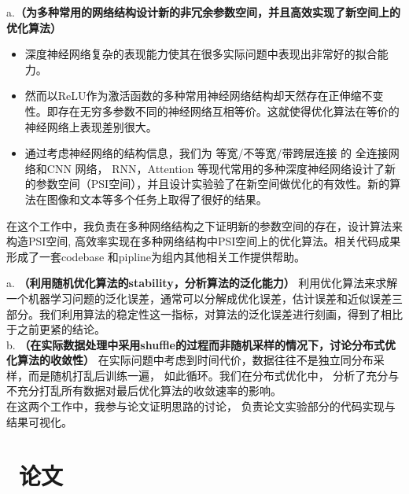 \documentclass{resume}
\begin{document}

a.\textbf{（为多种常用的网络结构设计新的非冗余参数空间，并且高效实现了新空间上的优化算法）} 

\begin{itemize}
  \item 深度神经网络复杂的表现能力使其在很多实际问题中表现出非常好的拟合能力。%
  \item 然而以ReLU作为激活函数的多种常用神经网络结构却天然存在正伸缩不变性。即存在无穷多参数不同的神经网络互相等价。这就使得优化算法在等价的神经网络上表现差别很大。
  \item 通过考虑神经网络的结构信息，我们为  等宽/不等宽/带跨层连接 的 全连接网络和CNN 网络， RNN，Attention 等现代常用的多种深度神经网络设计了新的参数空间（PSI空间），并且设计实验验了在新空间做优化的有效性。新的算法在图像和文本等多个任务上取得了很好的结果。
\end{itemize} 
    
 \faHandORight 在这个工作中，我负责在多种网络结构之下证明新的参数空间的存在，设计算法来构造PSI空间, 高效率实现在多种网络结构中PSI空间上的优化算法。相关代码成果形成了一套codebase 和pipline为组内其他相关工作提供帮助。

   

 a. \textbf{（利用随机优化算法的stability，分析算法的泛化能力）} 利用优化算法来求解一个机器学习问题的泛化误差，通常可以分解成优化误差，估计误差和近似误差三部分。我们利用算法的稳定性这一指标，对算法的泛化误差进行刻画，得到了相比于之前更紧的结论。 \\
 b. \textbf{（在实际数据处理中采用shuffle的过程而非随机采样的情况下，讨论分布式优化算法的收敛性）} 在实际问题中考虑到时间代价，数据往往不是独立同分布采样，而是随机打乱后训练一遍， 如此循环。我们在分布式优化中， 分析了充分与不充分打乱所有数据对最后优化算法的收敛速率的影响。\\
 \faHandORight 在这两个工作中，我参与论文证明思路的讨论， 负责论文实验部分的代码实现与结果可视化。

\section{\faBook\ 论文}
\end{document}
